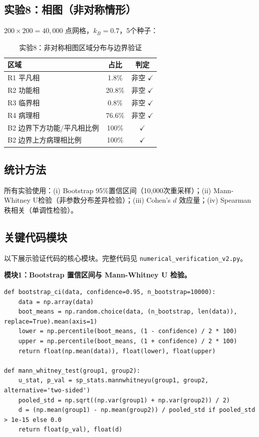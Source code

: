 \documentclass[12pt,a4paper]{article}
\theoremstyle{definition}
\begin{document}
\subsection{实验8：相图（非对称情形）}

$200 \times 200 = 40{,}000$ 点网格，$k_B = 0.7$，5个种子：

\begin{table}[htbp]
\centering
\caption{实验8：非对称相图区域分布与边界验证}
\label{tab:exp8}
\begin{tabular}{lcc}
\toprule
区域 & 占比 & 判定 \\
\midrule
R1 平凡相 & 1.8\% & 非空 $\checkmark$ \\
R2 功能相 & 20.8\% & 非空 $\checkmark$ \\
R3 临界相 & 0.8\% & 非空 $\checkmark$ \\
R4 病理相 & 76.6\% & 非空 $\checkmark$ \\
\midrule
B2 边界下方功能/平凡相比例 & 100\% & $\checkmark$ \\
B2 边界上方病理相比例 & 100\% & $\checkmark$ \\
\bottomrule
\end{tabular}
\end{table}

\subsection{统计方法}

所有实验使用：(i) Bootstrap 95\%置信区间（10,000次重采样）；(ii) Mann-Whitney U检验（非参数分布差异检验）；(iii) Cohen's $d$ 效应量；(iv) Spearman秩相关（单调性检验）。

\subsection{关键代码模块}

以下展示验证代码的核心模块。完整代码见 \texttt{numerical\_verification\_v2.py}。

\textbf{模块1：Bootstrap 置信区间与 Mann-Whitney U 检验。}
\begin{lstlisting}[caption={统计工具函数}, label={lst:stats}]
def bootstrap_ci(data, confidence=0.95, n_bootstrap=10000):
    data = np.array(data)
    boot_means = np.random.choice(data, (n_bootstrap, len(data)), replace=True).mean(axis=1)
    lower = np.percentile(boot_means, (1 - confidence) / 2 * 100)
    upper = np.percentile(boot_means, (1 + confidence) / 2 * 100)
    return float(np.mean(data)), float(lower), float(upper)

def mann_whitney_test(group1, group2):
    u_stat, p_val = sp_stats.mannwhitneyu(group1, group2, alternative='two-sided')
    pooled_std = np.sqrt((np.var(group1) + np.var(group2)) / 2)
    d = (np.mean(group1) - np.mean(group2)) / pooled_std if pooled_std > 1e-15 else 0.0
    return float(p_val), float(d)
\end{lstlisting}
\end{document}
